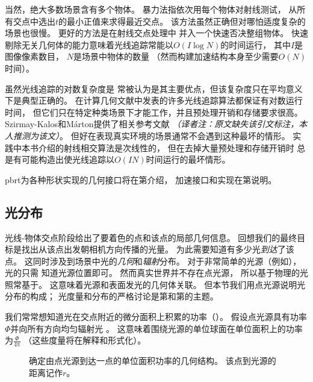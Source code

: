 当然，绝大多数场景含有多个物体。
暴力法指依次用每个物体对射线测试，
从所有交点中选出$t$的最小正值来求得最近交点。
该方法虽然正确但对哪怕适度复杂的场景也很慢。
更好的方法是在射线交点处理中
并入一个快速否决整组物体。
快速剔除无关几何体的能力意味着光线追踪常能以$O(I\log{N})$的时间运行，
其中$I$是图像像素数目，
$N$是场景中物体的数量
（然而构建加速结构本身至少需要$O(N)$时间）。
\begin{remark}
      虽然光线追踪的对数复杂度是
      常被认为是其主要优点，但该复杂度只在平均意义下是典型正确的。
      在计算几何文献中发表的许多光线追踪算法都保证有对数运行时间，
      但它们只在特定种类场景下才能工作，并且预处理开销和存储要求很高。
      Szirmay-Kalos和Márton提供了相关参考文献\citep{10.1007/BF02684409}
      {\itshape （译者注：原文缺失该引文标注，本人推测为该文）}。
      但好在表现真实环境的场景通常不会遇到这种最坏的情形。
      实践中本书介绍的射线相交算法是次线性的，
      但在去掉大量预处理和存储开销时
      总是有可能构造出使光线追踪以$O(IN)$时间运行的最坏情形。
\end{remark}

pbrt为各种形状实现的几何接口将在第介绍，
加速接口和实现在第说明。

\subsection{光分布}\label{sub:光分布}

光线-物体交点阶段给出了要着色的点和该点的局部几何信息。
回想我们的最终目标是找出从该点出发朝相机方向传播的光量。
为此需要知道有多少光\emph{到达}了该点。
这同时涉及到场景中光的\emph{几何}和\emph{辐射}分布。
对于非常简单的光源（例如），
光的只需
知道光源位置即可。
然而真实世界并不存在点光源，
所以基于物理的光照常基于。
这意味着光源和表面发光的几何体关联。
但本节我们用点光源说明光分布的构成；
光度量和分布的严格讨论是第和第的主题。

我们常常想知道光在交点附近的微分面积上积累的功率（）。
假设点光源具有功率
$\varPhi$并向所有方向均匀辐射光
。
这意味着围绕光源的单位球面在单位面积上的功率
为$\displaystyle\frac{\varPhi}{4\mathrm{\pi}}$
（这些度量将在解释和形式化）。
\begin{figure}
      \centering
      \caption{确定由点光源到达一点的单位面积功率的几何结构。
            该点到光源的距离记作$r$。}\label{fig:1.3}
\end{figure}


